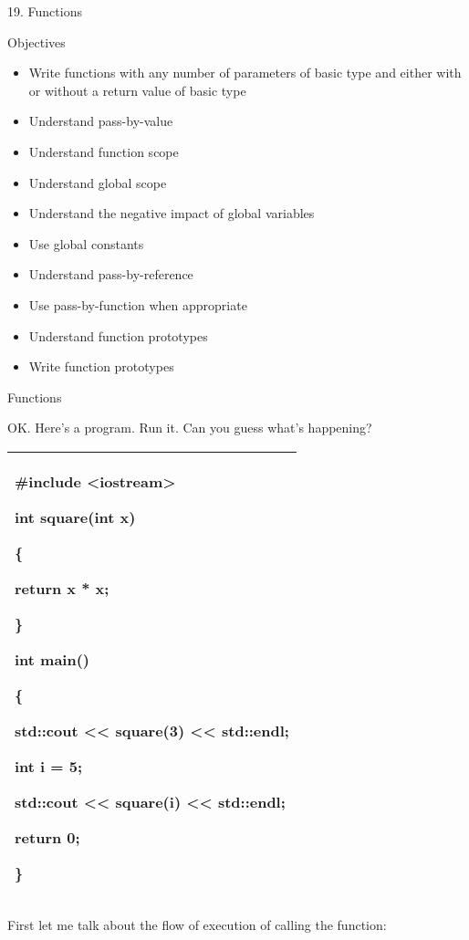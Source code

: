 \documentclass[
]{article}
\author{}
\date{}
\providecommand{\tightlist}{%
  \setlength{\itemsep}{0pt}\setlength{\parskip}{0pt}}
\begin{document}
19. Functions

Objectives

\begin{itemize}
\tightlist
\item
  Write functions with any number of parameters of basic type and either
  with or without a return value of basic type
\item
  Understand pass-by-value
\item
  Understand function scope
\item
  Understand global scope
\item
  Understand the negative impact of global variables
\item
  Use global constants
\item
  Understand pass-by-reference
\item
  Use pass-by-function when appropriate
\item
  Understand function prototypes
\item
  Write function prototypes
\end{itemize}

Functions

OK. Here's a program. Run it. Can you guess what's happening?

\begin{longtable}[]{@{}l@{}}
\toprule
\endhead
\begin{minipage}[t]{0.97\columnwidth}\raggedright
\#include \textless iostream\textgreater{}

int square(int x)

\{

return x * x;

\}

int main()

\{

std::cout \textless\textless{} square(3) \textless\textless{} std::endl;

int i = 5;

std::cout \textless\textless{} square(i) \textless\textless{} std::endl;

return 0;

\}\strut
\end{minipage}\tabularnewline
\bottomrule
\end{longtable}

First let me talk about the flow of execution of calling the function:
\end{document}
